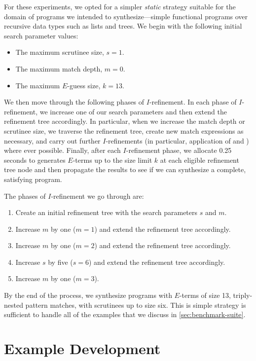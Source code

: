 For these experiments, we opted for a simpler \emph{static} strategy suitable for the domain of programs we intended to synthesize---simple functional programs over recursive data types such as lists and trees.  We begin with the following initial search parameter values:
\begin{itemize}
  \item The maximum scrutinee size, $s = 1$.
  \item The maximum match depth, $m = 0$.
  \item The maximum $E$-guess size, $k = 13$.
\end{itemize}
We then move through the following phases of $I$-refinement.
In each phase of $I$-refinement, we increase one of our search parameters and then extend the refinement tree accordingly.
In particular, when we increase the match depth or scrutinee size, we traverse the refinement tree, create new match expressions as necessary, and carry out further $I$-refinements (in particular, application of  and ) where ever possible.
Finally, after each $I$-refinement phase, we allocate 0.25 seconds to generates $E$-terms up to the size limit $k$ at each eligible refinement tree node and then propagate the results to see if we can synthesize a complete, satisfying program.

The phases of $I$-refinement we go through are:
\begin{enumerate}
  \item Create an initial refinement tree with the search parameters $s$ and $m$.
  \item Increase $m$ by one ($m = 1$) and extend the refinement tree accordingly.
  \item Increase $m$ by one ($m = 2$) and extend the refinement tree accordingly.
  \item Increase $s$ by five ($s = 6$) and extend the refinement tree accordingly.
  \item Increase $m$ by one ($m = 3$).
\end{enumerate}
By the end of the process, we synthesize programs with $E$-terms of size 13, triply-nested pattern matches, with scrutinees up to size six.
This is simple strategy is sufficient to handle all of the examples that we discuss in \autoref{sec:benchmark-suite}.

\section{Example Development}
\label{sec:example-development}

